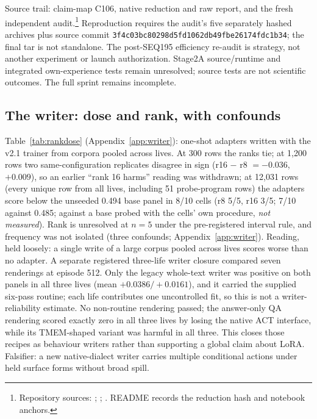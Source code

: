 \documentclass{article}
\newcommand{\nm}{\emph{not measured}}
\begin{document}
Source trail: claim-map C106, native reduction and raw report, and the fresh
independent audit.\footnote{Repository sources:
;
;
.
README records the reduction hash and notebook anchors.}
Reproduction requires the audit's five separately hashed archives plus source
commit \texttt{3f4c03bc80298d5fd1062db49fbe26174fdc1b34}; the final tar is
not standalone. The post-SEQ195 efficiency re-audit is strategy, not another
experiment or launch authorization. Stage2A source/runtime and integrated
own-experience tests remain unresolved; source tests are not scientific
outcomes. The full sprint remains incomplete.

\subsection{The writer: dose and rank, with confounds}
\label{sec:writer}

Table~\ref{tab:rankdose} (Appendix~\ref{app:writer}): one-shot adapters written with the v2.1 trainer from corpora pooled across lives. At 300 rows the ranks tie; at 1{,}200 rows two same-configuration replicates disagree in sign (r16 $-$ r8 $= -0.036$, $+0.009$), so an earlier ``rank 16 harms'' reading was withdrawn; at 12{,}031 rows (every unique row from all lives, including 51 probe-program rows) the adapters score below the unseeded 0.494 base panel in 8/10 cells (r8 5/5, r16 3/5; 7/10 against 0.485; against a base probed with the cells' own procedure, \nm). Rank is unresolved at $n = 5$ under the pre-registered interval rule, and frequency was not isolated (three confounds; Appendix~\ref{app:writer}).
Reading, held loosely: a single write of a large corpus pooled across lives scores worse than no adapter. A separate registered three-life writer closure compared seven renderings at episode 512. Only the legacy whole-text writer was positive on both panels in all three lives (mean $+0.0386/+0.0161$), and it carried the supplied six-pass routine; each life contributes one uncontrolled fit, so this is not a writer-reliability estimate. No non-routine rendering passed; the answer-only QA rendering scored exactly zero in all three lives by losing the native ACT interface, while its TMEM-shaped variant was harmful in all three. This closes those recipes as behaviour writers rather than supporting a global claim about LoRA. Falsifier: a new native-dialect writer carries multiple conditional actions under held surface forms without broad spill.
\end{document}
